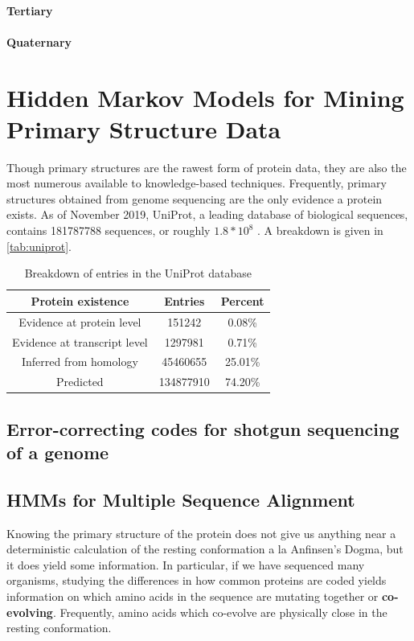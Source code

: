 \documentclass{article}
\begin{document}
\paragraph{Tertiary}

\paragraph{Quaternary}

\section{Hidden Markov Models for Mining Primary Structure Data}
Though primary structures are the rawest form of protein data, they are also the most numerous available to knowledge-based techniques. Frequently, primary structures obtained from genome sequencing are the only evidence a protein exists. As of November 2019, UniProt, a leading database of biological sequences, contains 181787788 sequences, or roughly $1.8 * 10^8$ \cite{uniprot}. A breakdown is given in \autoref{tab:uniprot}. 

\begin{table}[h!]
    \centering
       \begin{tabular}{|c||c||c|}
        \hline
        \hline
        Protein existence & Entries & Percent \\ \hline
        Evidence at protein level & 151242 & 0.08\% \\ \hline
        Evidence at transcript level & 1297981 & 0.71\% \\ \hline
        Inferred from homology & 45460655 & 25.01\% \\ \hline
        Predicted & 134877910 & 74.20\% \\ \hline
        \end{tabular}
    \caption{Breakdown of entries in the UniProt database}
    \label{tab:uniprot}
\end{table}

\subsection{Error-correcting codes for shotgun sequencing of a genome}


\subsection{HMMs for Multiple Sequence Alignment}
Knowing the primary structure of the protein does not give us anything near a deterministic calculation of the resting conformation a la Anfinsen's Dogma, but it does yield some information. In particular, if we have sequenced many organisms, studying the differences in how common proteins are coded yields information on which amino acids in the sequence are mutating together or \textbf{co-evolving}. Frequently, amino acids which co-evolve are physically close in the resting conformation. 
\end{document}
